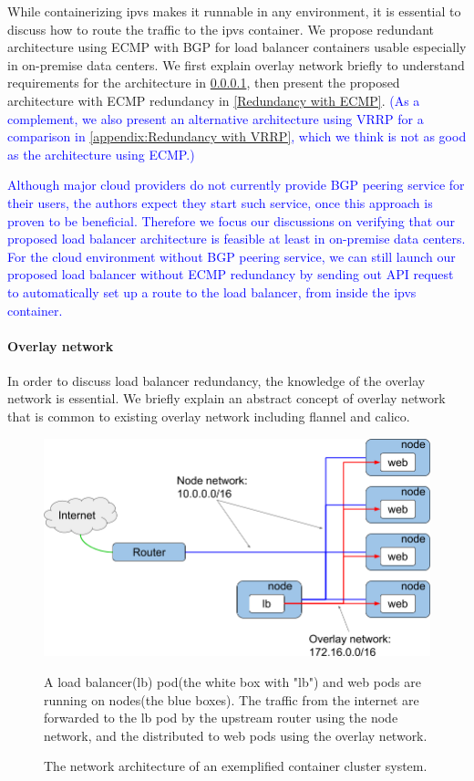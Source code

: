 While containerizing ipvs makes it runnable in any environment, it is essential to discuss how to route the traffic to the ipvs container.
We propose redundant architecture using ECMP with BGP for load balancer containers usable especially in on-premise data centers.
We first explain overlay network briefly to understand requirements for the architecture in \ref{Overlay network}, then present the proposed architecture with ECMP redundancy in \ref{Redundancy with ECMP}. 
\textcolor{blue}{
(As a complement, we also present an alternative architecture using VRRP for a comparison in \ref{appendix:Redundancy with VRRP}, which we think is not as good as the architecture using ECMP.)
}

\textcolor{blue}{
Although major cloud providers do not currently provide BGP peering service for their users, the authors expect they start such service, once this approach is proven to be beneficial.
Therefore we focus our discussions on verifying that our proposed load balancer architecture is feasible at least in on-premise data centers.
For the cloud environment without BGP peering service, we can still launch our proposed load balancer without ECMP redundancy by sending out API request to automatically set up a route to the load balancer, from inside the ipvs container.
}

\paragraph{\bf Overlay network}\label{Overlay network}

In order to discuss load balancer redundancy, the knowledge of the overlay network is essential.
We briefly explain an abstract concept of overlay network that is common to existing overlay network including flannel\cite{coreos_2018} and calico\cite{project_calico}.

\begin{figure}[tb]
\begin{center}
\includegraphics[width=\columnwidth]{Figs/overlay.png}
\end{center}
\caption{The network architecture of an exemplified container cluster system.}
A load balancer(lb) pod(the white box with "lb") and web pods are running on nodes(the blue boxes).
  The traffic from the internet are forwarded to the lb pod by the upstream router using the node network,
  and the distributed to web pods using the overlay network.
\label{fig:overlay}
\end{figure}

